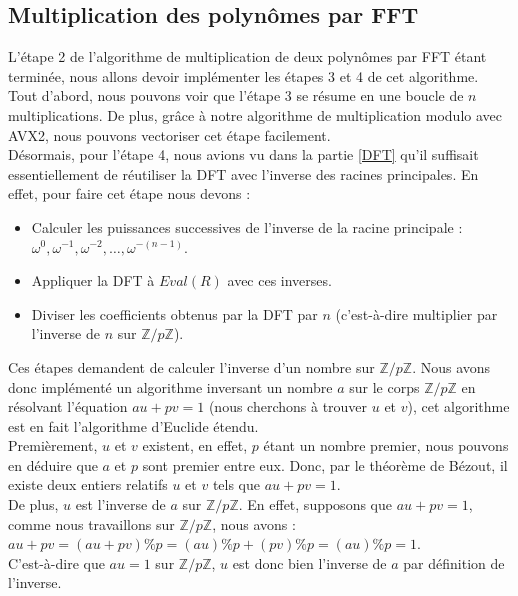 \documentclass[12pt, a4paper]{article}
\begin{document}
\subsection{Multiplication des polynômes par FFT}
L'étape 2 de l'algorithme de multiplication de deux polynômes par FFT étant terminée, nous allons devoir implémenter les étapes 3 et 4 de cet algorithme. \\
\indent Tout d'abord, nous pouvons voir que l'étape 3 se résume en une boucle de $n$ multiplications. De plus, grâce à notre algorithme de multiplication modulo avec AVX2, nous pouvons vectoriser cet étape facilement. \\
\indent Désormais, pour l'étape 4, nous avions vu dans la partie \ref{DFT} qu'il suffisait essentiellement de réutiliser la DFT avec l'inverse des racines principales. En effet, pour faire cet étape nous devons :
{\begin{itemize}
  \item Calculer les puissances successives de l'inverse de la racine principale : \\
   $\omega^{0},\omega^{-1},\omega^{-2},\dots,\omega^{-(n-1)}$.
  \item Appliquer la DFT à $Eval(R)$ avec ces inverses.
  \item Diviser les coefficients obtenus par la DFT par $n$ (c'est-à-dire multiplier par l'inverse de $n$ sur $\mathbb{Z}/p\mathbb{Z}$).
\end{itemize}}
\indent Ces étapes demandent de calculer l'inverse d'un nombre sur $\mathbb{Z}/p\mathbb{Z}$. Nous avons donc implémenté un algorithme inversant un nombre $a$ sur le corps $\mathbb{Z}/p\mathbb{Z}$ en résolvant l'équation $au + pv = 1$ (nous cherchons à trouver $u$ et $v$), cet algorithme est en fait l'algorithme d'Euclide étendu.
\\
Premièrement, $u$ et $v$ existent, en effet, $p$ étant un nombre premier, nous pouvons en déduire que $a$ et $p$ sont premier entre eux. Donc, par le théorème de Bézout, il existe deux entiers relatifs $u$ et $v$ tels que $au + pv = 1$. \\
De plus, $u$ est l'inverse de $a$ sur $\mathbb{Z}/p\mathbb{Z}$. En effet, supposons que $au + pv = 1$, comme nous travaillons sur $\mathbb{Z}/p\mathbb{Z}$, nous avons : \\
$au+pv = (au+pv)\%p = (au)\%p + (pv)\%p = (au)\%p = 1$. \\ 
C'est-à-dire que $au = 1$ sur $\mathbb{Z}/p\mathbb{Z}$, $u$ est donc bien l'inverse de $a$ par définition de l'inverse. \\
\end{document}
